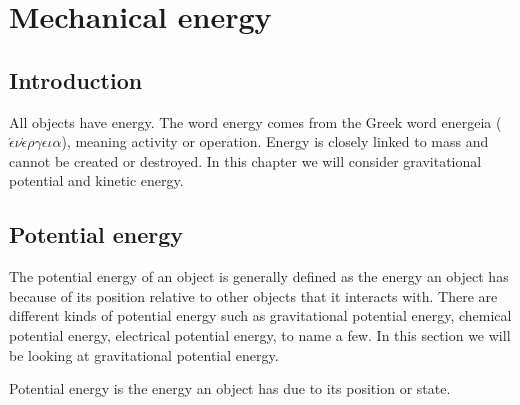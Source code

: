          \chapter{Mechanical energy} \label{chap:energy}
    \setcounter{figure}{1}
    \setcounter{subfigure}{1}
    \label{1fc5ba69690764517c30802fdf7b1905}
         \section{Introduction}
    \nopagebreak
            \label{m38784*id7521}All objects have energy. The word energy comes from the Greek word energeia ($\acute{\epsilon} \nu \acute{\epsilon} \rho \gamma \epsilon \iota \alpha $), meaning activity or operation. Energy is closely linked to mass and cannot be created or destroyed. In this chapter we will consider gravitational potential and kinetic energy. 
\par \label{m38784*cid4}
            \section{Potential energy}
            \nopagebreak
      \label{m38784*id66142}The potential energy of an object is generally defined as the energy an object has because of its position relative to other objects that it interacts with. There are different kinds of potential energy such as gravitational potential energy, chemical potential energy, electrical potential energy, to name a few. In this section we will be looking at gravitational potential energy.\par 
{} { Potential energy is the energy an object has due to its position or state. } 


